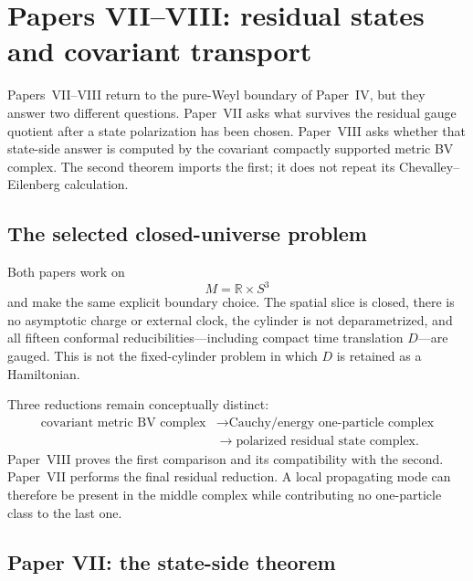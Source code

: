 \documentclass[11pt]{article}
\theoremstyle{remark}
\newcommand{\R}{\mathbb{R}}
\begin{document}
\section{Papers VII--VIII: residual states and covariant transport}
\label{sec:conformalcohomology}

Papers~VII--VIII \cite{paperVII,paperVIII} return to the pure-Weyl boundary
of Paper~IV, but they answer two different questions.  Paper~VII asks what
survives the residual gauge quotient after a state polarization has been
chosen.  Paper~VIII asks whether that state-side answer is computed by the
covariant compactly supported metric BV complex.  The second theorem imports
the first; it does not repeat its Chevalley--Eilenberg calculation.

\subsection{The selected closed-universe problem}

Both papers work on
\begin{equation}
 M=\R\times S^3
\end{equation}
and make the same explicit boundary choice.  The spatial slice is closed,
there is no asymptotic charge or external clock, the cylinder is not
deparametrized, and all fifteen conformal reducibilities---including compact
time translation $D$---are gauged.  This is not the fixed-cylinder problem
in which $D$ is retained as a Hamiltonian.

Three reductions remain conceptually distinct:
\begin{equation}\label{eq:three-reductions-vii-viii}
 \begin{aligned}
 \text{covariant metric BV complex}
 &\longrightarrow \text{Cauchy/energy one-particle complex}\\
 &\longrightarrow \text{polarized residual state complex}.
 \end{aligned}
\end{equation}
Paper~VIII proves the first comparison and its compatibility with the second.
Paper~VII performs the final residual reduction.  A local propagating mode
can therefore be present in the middle complex while contributing no
one-particle class to the last one.

\subsection{Paper VII: the state-side theorem}
\end{document}
